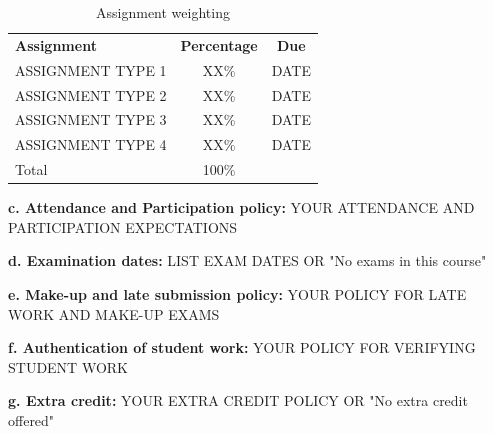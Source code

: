 \documentclass[12pt]{article}     %
\begin{document}
\begin{center}
\begin{table}[h]
  \caption{Assignment weighting}
  \centering
  \begin{tabularx}{\linewidth}{L c c}
  \textbf{Assignment} & \textbf{Percentage} & \textbf{Due} \\
  ASSIGNMENT TYPE 1 & XX\%       & DATE \\
  ASSIGNMENT TYPE 2 & XX\%       & DATE \\
  ASSIGNMENT TYPE 3 & XX\%       & DATE \\
  ASSIGNMENT TYPE 4 & XX\%       & DATE \\
  Total             & 100\%      & \\
  \end{tabularx}
\end{table}
\end{center}


\vspace{1em}
\noindent \textbf{c. Attendance and Participation policy:}
YOUR ATTENDANCE AND PARTICIPATION EXPECTATIONS

\vspace{1em}
\noindent \textbf{d. Examination dates:}
LIST EXAM DATES OR "No exams in this course"

\vspace{1em}
\noindent \textbf{e. Make-up and late submission policy:}
YOUR POLICY FOR LATE WORK AND MAKE-UP EXAMS

\vspace{1em}
\noindent \textbf{f. Authentication of student work:}
YOUR POLICY FOR VERIFYING STUDENT WORK

\vspace{1em}
\noindent \textbf{g. Extra credit:}
YOUR EXTRA CREDIT POLICY OR "No extra credit offered"
\end{document}
